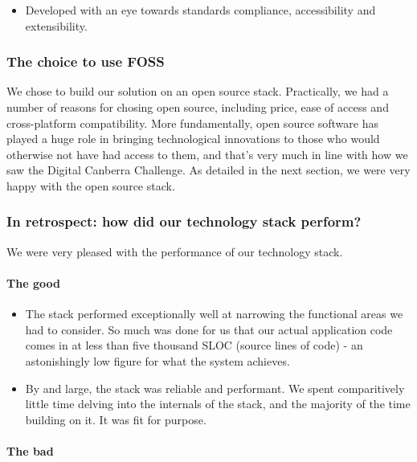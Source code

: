 \documentclass[12pt,a4paper,twosided]{article}
\begin{document}
\begin{itemize}
  \begin{itemize}
  
  \item
    Developed with an eye towards standards compliance, accessibility
    and extensibility.
  \end{itemize}
\end{itemize}

\subsubsection{The choice to use FOSS}

We chose to build our solution on an open source stack. Practically, we
had a number of reasons for chosing open source, including price, ease
of access and cross-platform compatibility. More fundamentally, open
source software has played a huge role in bringing technological
innovations to those who would otherwise not have had access to them,
and that's very much in line with how we saw the Digital Canberra
Challenge. As detailed in the next section, we were very happy with the
open source stack.

\subsubsection{In retrospect: how did our technology stack perform?}

We were very pleased with the performance of our technology stack.

\paragraph{The good}

\begin{itemize}

\item
  The stack performed exceptionally well at narrowing the functional
  areas we had to consider. So much was done for us that our actual
  application code comes in at less than five thousand SLOC (source
  lines of code) - an astonishingly low figure for what the system
  achieves.
\item
  By and large, the stack was reliable and performant. We spent
  comparitively little time delving into the internals of the stack, and
  the majority of the time building on it. It was fit for purpose.
\end{itemize}

\paragraph{The bad}
\end{document}
